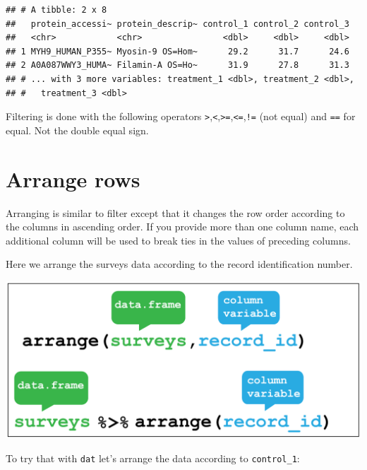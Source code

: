 \documentclass[12pt,]{book}
\newenvironment{Shaded}{\begin{snugshade}}{\end{snugshade}}
\newcommand{\DecValTok}[1]{\textcolor[rgb]{0.00,0.00,0.81}{#1}}
\newcommand{\KeywordTok}[1]{\textcolor[rgb]{0.13,0.29,0.53}{\textbf{#1}}}
\newcommand{\NormalTok}[1]{#1}
\newcommand{\OperatorTok}[1]{\textcolor[rgb]{0.81,0.36,0.00}{\textbf{#1}}}
\newcommand{\StringTok}[1]{\textcolor[rgb]{0.31,0.60,0.02}{#1}}
\begin{document}
\begin{verbatim}
## # A tibble: 2 x 8
##   protein_accessi~ protein_descrip~ control_1 control_2 control_3
##   <chr>            <chr>                <dbl>     <dbl>     <dbl>
## 1 MYH9_HUMAN_P355~ Myosin-9 OS=Hom~      29.2      31.7      24.6
## 2 A0A087WWY3_HUMA~ Filamin-A OS=Ho~      31.9      27.8      31.3
## # ... with 3 more variables: treatment_1 <dbl>, treatment_2 <dbl>,
## #   treatment_3 <dbl>
\end{verbatim}

Filtering is done with the following operators \texttt{\textgreater{}},\texttt{\textless{}},\texttt{\textgreater{}=},\texttt{\textless{}=},\texttt{!=} (not equal)
and \texttt{==} for equal. Not the double equal sign.

\hypertarget{arrange-rows}{%
\section{Arrange rows}\label{arrange-rows}}

Arranging is similar to filter except that it changes the row order according
to the columns in ascending order. If you provide more than one column name,
each additional column will be used to break ties in the values of preceding
columns.

Here we arrange the surveys data according to the record identification number.

\begin{center}\includegraphics[width=0.8\linewidth]{img/dplyr_arrange} \end{center}

To try that with \texttt{dat} let's arrange the data according to \texttt{control\_1}:

\begin{Shaded}
\end{Shaded}
\end{document}
